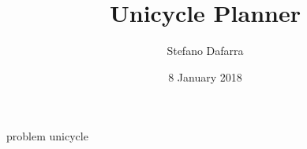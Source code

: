 \documentclass[10 pt]{article}  %
\date{8 January 2018}
\title{\LARGE \bf
Unicycle Planner}
\author{Stefano Dafarra}
\begin{document}
	
\maketitle
\thispagestyle{empty}
\pagestyle{empty}


{problem}
{unicycle}

\addtolength{\textheight}{0cm}   %




\end{document}
